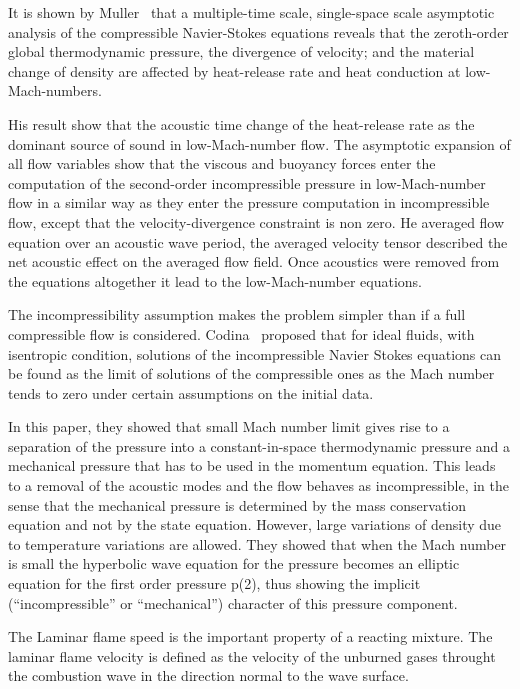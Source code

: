 It is shown by Muller~\cite{Muller} that a multiple-time scale,
single-space scale asymptotic analysis of the compressible
Navier-Stokes equations reveals that the zeroth-order global
thermodynamic pressure, the divergence of velocity; and the material
change of density are affected by heat-release rate and heat
conduction at low-Mach-numbers.

\bigskip
 His result show that the acoustic time change of the
heat-release rate as the dominant source of sound in low-Mach-number
flow. The asymptotic expansion of all flow variables show that the
viscous and buoyancy forces enter the computation of the second-order
incompressible pressure in low-Mach-number flow in a similar way as
they enter the pressure computation in incompressible flow, except
that the velocity-divergence constraint is non zero. He averaged flow
equation over an acoustic wave period, the averaged velocity tensor
described the net acoustic effect on the averaged flow field. Once
acoustics were removed from the equations altogether it lead to the
low-Mach-number equations.

\bigskip
 The incompressibility assumption makes the problem simpler
than if a full compressible flow is considered. Codina~\cite{Codina}
proposed that for ideal fluids, with isentropic condition, solutions
of the incompressible Navier Stokes equations can be found as the
limit of solutions of the compressible ones as the Mach number tends
to zero under certain assumptions on the initial data.

 In this paper, they showed that small Mach number limit
gives rise to a separation of the pressure into a constant-in-space
thermodynamic pressure and a mechanical pressure that has to be used
in the momentum equation. This leads to a removal of the acoustic
modes and the flow behaves as incompressible, in the sense that the
mechanical pressure is determined by the mass conservation equation
and not by the state equation. However, large variations of density
due to temperature variations are allowed. They showed that when the
Mach number is small the hyperbolic wave equation for the pressure
becomes an elliptic equation for the first order pressure p(2), thus
showing the implicit (“incompressible” or “mechanical”) character of
this pressure component.


 The Laminar flame speed is the important property of a
reacting mixture. The laminar flame velocity is defined as the
velocity of the unburned gases throught the combustion wave in the
direction normal to the wave surface.

